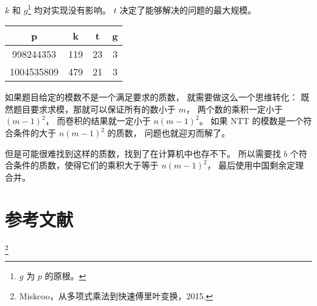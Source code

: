 \documentclass[12pt, UTF8]{article}
\begin{document}
    $k$ 和 $g$\footnote{$g$ 为 $p$ 的原根。} 均对实现没有影响。
    $t$ 决定了能够解决的问题的最大规模。

    \bigskip
    \begin{center}
        \setlength{\tabcolsep}{10mm}
        \begin{tabular}{|c|c|c|c|}
        \hline
        p & k & t & g\\
        \hline
        998244353 & 119 & 23 & 3\\
        \hline
        1004535809 & 479 & 21 & 3\\
        \hline
        \end{tabular}
    \end{center}

    如果题目给定的模数不是一个满足要求的质数，
    就需要做这么一个思维转化：
    既然题目要求求模，那就可以保证所有的数小于 $m$，
    两个数的乘积一定小于 $(m - 1)^2$，
    而卷积的结果就一定小于 $n(m - 1)^2$。
    如果 NTT 的模数是一个符合条件的大于 $n(m - 1)^2$ 的质数，
    问题也就迎刃而解了。

    但是可能很难找到这样的质数，找到了在计算机中也存不下。
    所以需要找 $b$ 个符合条件的质数，使得它们的乘积大于等于 $n(m - 1)^2$，
    最后使用中国剩余定理合并。

    \section{参考文献}
    \thanks {Miskcoo，从多项式乘法到快速傅里叶变换，2015.}
\end{document}
